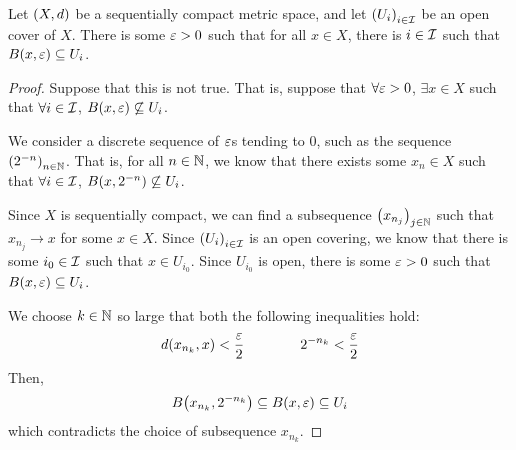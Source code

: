 \begin{boxlemma}\label{Ch1:Lemma:Lebesgue_number_aux}
    Let $\left( X, d \right)$ be a sequentially compact metric space, and let $\left( U_i \right)_{i \in \mathcal{I}}$ be an open cover of $X$. There is some $\varepsilon > 0$ such that for all $x \in X$, there is $i \in \mathcal{I}$ such that $B\!\left( x, \varepsilon \right) \subseteq U_i$.
\end{boxlemma}
\begin{proof}
    Suppose that this is not true. That is, suppose that $\forall \varepsilon > 0$, $\exists x \in X$ such that $\forall i \in \mathcal{I}$, $B\!\left( x, \varepsilon \right) \not\subseteq U_i$.
    
    We consider a discrete sequence of $\varepsilon$s tending to $0$, such as the sequence $\left( 2^{-n} \right)_{n \in \mathbb{N}}$. That is, for all $n \in \mathbb{N}$, we know that there exists some $x_n \in X$ such that $\forall i \in \mathcal{I}$, $B\!\left( x, 2^{-n} \right) \not\subseteq U_i$.
    
    Since $X$ is sequentially compact, we can find a subsequence $\left( x_{n_j} \right)_{j \in \mathbb{N}}$ such that $x_{n_j} \to x$ for some $x \in X$. Since $\left( U_i \right)_{i \in \mathcal{I}}$ is an open covering, we know that there is some $i_0 \in \mathcal{I}$ such that $x \in U_{i_0}$. Since $U_{i_0}$ is open, there is some $\varepsilon > 0$ such that $B\!\left( x, \varepsilon \right) \subseteq U_i$.

    We choose $k \in \mathbb{N}$ so large that both the following inequalities hold:
    \begin{align*}
        d\!\left( x_{n_k}, x \right) < \frac{\varepsilon}{2}
        \qquad \qquad
        2^{-n_k} < \frac{\varepsilon}{2}
    \end{align*}
    Then,
    \begin{align*}
        B\!\left( x_{n_k}, 2^{-n_k} \right) \subseteq B\!\left( x, \varepsilon \right) \subseteq U_i
    \end{align*}
    which contradicts the choice of subsequence $x_{n_k}$. %
\end{proof}

